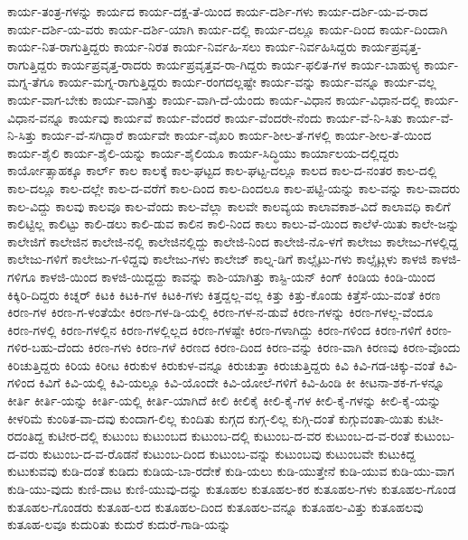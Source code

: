{ಕಾರ್ಯ-ತಂತ್ರ-ಗಳನ್ನು
ಕಾರ್ಯದ
ಕಾರ್ಯ-ದಕ್ಷ-ತೆ-ಯಿಂದ
ಕಾರ್ಯ-ದರ್ಶಿ-ಗಳು
ಕಾರ್ಯ-ದರ್ಶಿ-ಯ-ವ-ರಾದ
ಕಾರ್ಯ-ದರ್ಶಿ-ಯ-ವರು
ಕಾರ್ಯ-ದರ್ಶಿ-ಯಾಗಿ
ಕಾರ್ಯ-ದಲ್ಲಿ
ಕಾರ್ಯ-ದಲ್ಲೂ
ಕಾರ್ಯ-ದಿಂದ
ಕಾರ್ಯ-ದಿಂದಾಗಿ
ಕಾರ್ಯ-ನಿತ-ರಾಗುತ್ತಿದ್ದರು
ಕಾರ್ಯ-ನಿರತ
ಕಾರ್ಯ-ನಿರ್ವಹಿ-ಸಲು
ಕಾರ್ಯ-ನಿರ್ವಹಿಸಿದ್ದರು
ಕಾರ್ಯಪ್ರವೃತ್ತ-ರಾಗುತ್ತಿದ್ದರು
ಕಾರ್ಯಪ್ರವೃತ್ತ-ರಾದರು
ಕಾರ್ಯಪ್ರವೃತ್ತವ-ರಾ-ಗಿದ್ದರು
ಕಾರ್ಯ-ಫಲಿತ-ಗಳ
ಕಾರ್ಯ-ಬಾಹುಳ್ಯ
ಕಾರ್ಯ-ಮಗ್ನ-ತೆಗೂ
ಕಾರ್ಯ-ಮಗ್ನ-ರಾಗುತ್ತಿದ್ದರು
ಕಾರ್ಯ-ರಂಗದಲ್ಲಷ್ಟೇ
ಕಾರ್ಯ-ವನ್ನು
ಕಾರ್ಯ-ವನ್ನೂ
ಕಾರ್ಯ-ವಲ್ಲ
ಕಾರ್ಯ-ವಾಗ-ಬೇಕು
ಕಾರ್ಯ-ವಾಗಿತ್ತು
ಕಾರ್ಯ-ವಾಗಿ-ದೆ-ಯೆಂದು
ಕಾರ್ಯ-ವಿಧಾನ
ಕಾರ್ಯ-ವಿಧಾನ-ದಲ್ಲಿ
ಕಾರ್ಯ-ವಿಧಾನ-ವನ್ನೂ
ಕಾರ್ಯವು
ಕಾರ್ಯವೆ
ಕಾರ್ಯ-ವೆಂದರೆ
ಕಾರ್ಯ-ವೆಂದರೇ-ನೆಂದು
ಕಾರ್ಯ-ವೆ-ನಿ-ಸಿತು
ಕಾರ್ಯ-ವೆ-ನಿ-ಸಿತ್ತು
ಕಾರ್ಯ-ವೆ-ಸಗಿದ್ದಾರೆ
ಕಾರ್ಯವೇ
ಕಾರ್ಯ-ವೈಖರಿ
ಕಾರ್ಯ-ಶೀಲ-ತೆ-ಗಳಲ್ಲಿ
ಕಾರ್ಯ-ಶೀಲ-ತೆ-ಯಿಂದ
ಕಾರ್ಯ-ಶೈಲಿ
ಕಾರ್ಯ-ಶೈಲಿ-ಯನ್ನು
ಕಾರ್ಯ-ಶೈಲಿಯೂ
ಕಾರ್ಯ-ಸಿದ್ಧಿಯು
ಕಾರ್ಯಾಲಯ-ದಲ್ಲಿದ್ದರು
ಕಾರ್ಯೋತ್ಸಾಹಕ್ಕೂ
ಕಾರ್ಲ್
ಕಾಲ
ಕಾಲಕ್ಕೆ
ಕಾಲ-ಘಟ್ಟದ
ಕಾಲ-ಘಟ್ಟ-ದಲ್ಲೂ
ಕಾಲದ
ಕಾಲ-ದ-ನಂತರ
ಕಾಲ-ದಲ್ಲಿ
ಕಾಲ-ದಲ್ಲೂ
ಕಾಲ-ದಲ್ಲೇ
ಕಾಲ-ದ-ವರೆಗೆ
ಕಾಲ-ದಿಂದ
ಕಾಲ-ದಿಂದಲೂ
ಕಾಲ-ಪಟ್ಟಿ-ಯನ್ನು
ಕಾಲ-ವನ್ನು
ಕಾಲ-ವಾದರು
ಕಾಲ-ವಿದ್ದು
ಕಾಲವು
ಕಾಲವೂ
ಕಾಲ-ವೆಂದು
ಕಾಲ-ವೆಲ್ಲಾ
ಕಾಲವೇ
ಕಾಲವ್ಯಯ
ಕಾಲಾವಕಾಶ-ವಿದೆ
ಕಾಲಾವಧಿ
ಕಾಲಿಗೆ
ಕಾಲಿಟ್ಟಿಲ್ಲ
ಕಾಲಿಟ್ಟು
ಕಾಲಿ-ಡಲು
ಕಾಲಿ-ಡುವ
ಕಾಲಿನ
ಕಾಲಿ-ನಿಂದ
ಕಾಲು
ಕಾಲು-ವೆ-ಯಿಂದ
ಕಾಲೆಳೆ-ಯಿತು
ಕಾಲೇ-ಜನ್ನು
ಕಾಲೇಜಿಗೆ
ಕಾಲೇಜಿನ
ಕಾಲೇಜಿ-ನಲ್ಲಿ
ಕಾಲೇಜಿನಲ್ಲಿದ್ದು
ಕಾಲೇಜಿ-ನಿಂದ
ಕಾಲೇಜಿ-ನೊ-ಳಗೆ
ಕಾಲೇಜು
ಕಾಲೇಜು-ಗಳಲ್ಲಿದ್ದ
ಕಾಲೇಜು-ಗಳಿಗೆ
ಕಾಲೇಜು-ಗ-ಳಿದ್ದವು
ಕಾಲೇಜು-ಗಳು
ಕಾಲೇಜ್
ಕಾಲ್ನ-ಡಿಗೆ
ಕಾಲ್ಸೈಟು-ಗಳು
ಕಾಲ್ಸೈಟ್ಗಳು
ಕಾಳಜಿ
ಕಾಳಜಿ-ಗಳಿಗೂ
ಕಾಳಜಿ-ಯಿಂದ
ಕಾಳಜಿ-ಯಿದ್ದದ್ದು
ಕಾವನ್ನು
ಕಾಶಿ-ಯಾಗಿತ್ತು
ಕಾಸ್ಟಿ-ಯನ್
ಕಿಂಗ್
ಕಿಂಡಿಯ
ಕಿಂಡಿ-ಯಿಂದ
ಕಿಕ್ಕಿರಿ-ದಿದ್ದರು
ಕಿಚ್ನರ್
ಕಿಟಕಿ
ಕಿಟಕಿ-ಗಳ
ಕಿಟಕಿ-ಗಳು
ಕಿತ್ತದ್ದಲ್ಲ-ವಲ್ಲ
ಕಿತ್ತು
ಕಿತ್ತು-ಕೊಂಡು
ಕಿತ್ತೆಸೆ-ಯು-ವಂತೆ
ಕಿರಣ
ಕಿರಣ-ಗಳ
ಕಿರಣ-ಗ-ಳಂತೆಯೇ
ಕಿರಣ-ಗಳ-ಡಿ-ಯಲ್ಲಿ
ಕಿರಣ-ಗಳ-ನ-ಡುವೆ
ಕಿರಣ-ಗಳನ್ನು
ಕಿರಣ-ಗಳಲ್ಲ-ವೆಂದೂ
ಕಿರಣ-ಗಳಲ್ಲಿ
ಕಿರಣ-ಗಳಲ್ಲಿನ
ಕಿರಣ-ಗಳಲ್ಲಿಲ್ಲದ
ಕಿರಣ-ಗಳಷ್ಟೇ
ಕಿರಣ-ಗಳಾಗಿದ್ದು
ಕಿರಣ-ಗಳಿಂದ
ಕಿರಣ-ಗಳಿಗೆ
ಕಿರಣ-ಗಳಿರ-ಬಹು-ದೆಂದು
ಕಿರಣ-ಗಳು
ಕಿರಣ-ಗಳೆ
ಕಿರಣದ
ಕಿರಣ-ದಿಂದ
ಕಿರಣ-ವನ್ನು
ಕಿರಣ-ವಾಗಿ
ಕಿರಣವು
ಕಿರಣ-ವೊಂದು
ಕಿರಿಚುತ್ತಿದ್ದರು
ಕಿರಿಯ
ಕಿರೀಟ
ಕಿರುಕುಳ
ಕಿರುಕುಳ-ವನ್ನೂ
ಕಿರುಚುತ್ತಾ
ಕಿರುಚುತ್ತಿದ್ದರು
ಕಿವಿ
ಕಿವಿ-ಗಡ-ಚಿಕ್ಕು-ವಂತೆ
ಕಿವಿ-ಗಳಿಂದ
ಕಿವಿಗೆ
ಕಿವಿ-ಯಲ್ಲಿ
ಕಿವಿ-ಯಲ್ಲೂ
ಕಿವಿ-ಯೊಂದೇ
ಕಿವಿ-ಯೋಲೆ-ಗಳಿಗೆ
ಕಿವಿ-ಹಿಂಡಿ
ಕೀ
ಕೀಟನಾ-ಶಕ-ಗ-ಳನ್ನೂ
ಕೀರ್ತಿ
ಕೀರ್ತಿ-ಯನ್ನು
ಕೀರ್ತಿ-ಯಲ್ಲಿ
ಕೀರ್ತಿ-ಯಾಗಿದೆ
ಕೀಲಿ
ಕೀಲಿಕೈ
ಕೀಲಿ-ಕೈ-ಗಳ
ಕೀಲಿ-ಕೈ-ಗಳನ್ನು
ಕೀಲಿ-ಕೈ-ಯನ್ನು
ಕೀಳರಿಮೆ
ಕುಂಠಿತ-ವಾ-ದವು
ಕುಂದಾಗ-ಲಿಲ್ಲ
ಕುಂದಿತು
ಕುಗ್ಗದ
ಕುಗ್ಗ-ಲಿಲ್ಲ
ಕುಗ್ಗಿ-ದಂತೆ
ಕುಗ್ಗುವಂತಾ-ಯಿತು
ಕುಟೀ-ರದಂತಿದ್ದ
ಕುಟೀರ-ದಲ್ಲಿ
ಕುಟುಂಬ
ಕುಟುಂಬದ
ಕುಟುಂಬ-ದಲ್ಲಿ
ಕುಟುಂಬ-ದ-ವರ
ಕುಟುಂಬ-ದ-ವ-ರಂತೆ
ಕುಟುಂಬ-ದ-ವರು
ಕುಟುಂಬ-ದ-ವ-ರೊಡನೆ
ಕುಟುಂಬ-ದಿಂದ
ಕುಟುಂಬ-ವನ್ನು
ಕುಟುಂಬವು
ಕುಟುಂಬವೇ
ಕುಟುಕಿದ್ದ
ಕುಟುಕುವವು
ಕುಡಿ-ದಂತೆ
ಕುಡಿದು
ಕುಡಿಯ-ಬಾ-ರದೇಕೆ
ಕುಡಿ-ಯಲು
ಕುಡಿ-ಯುತ್ತೇನೆ
ಕುಡಿ-ಯುವ
ಕುಡಿ-ಯು-ವಾಗ
ಕುಡಿ-ಯು-ವುದು
ಕುಣಿ-ದಾಟ
ಕುಣಿ-ಯುವು-ದನ್ನು
ಕುತೂಹಲ
ಕುತೂಹಲ-ಕರ
ಕುತೂಹಲ-ಗಳು
ಕುತೂಹಲ-ಗೊಂಡ
ಕುತೂಹಲ-ಗೊಂಡರು
ಕುತೂಹ-ಲದ
ಕುತೂಹಲ-ದಿಂದ
ಕುತೂಹಲ-ವನ್ನೂ
ಕುತೂಹಲ-ವಿತ್ತು
ಕುತೂಹಲವು
ಕುತೂಹ-ಲವೂ
ಕುದುರಿತು
ಕುದುರೆ
ಕುದುರೆ-ಗಾಡಿ-ಯನ್ನು
}
